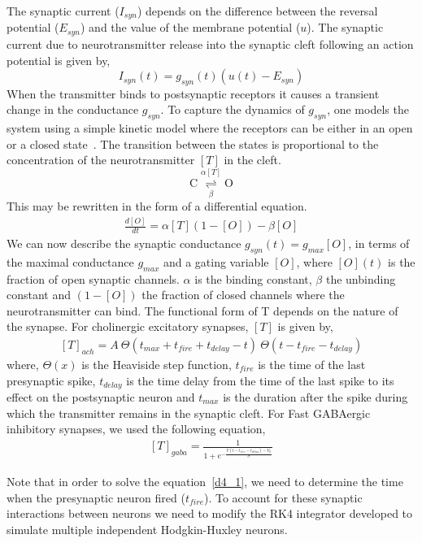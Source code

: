 \documentclass[10pt,letterpaper]{article}
\begin{document}
\begin{nolinenumbers}
The synaptic current ($I_{syn}$) depends on the difference between the reversal potential ($E_{syn}$) and the value of the membrane potential ($u$). The synaptic current due to neurotransmitter release into the synaptic cleft following an action potential is given by,
\begin{equation}
I_{syn}(t)=g_{syn}(t)(u(t)−E_{syn})
\label{eq:syncurr}
\end{equation}
When the transmitter binds to postsynaptic receptors it causes a transient change in the conductance $g_{syn}$. To capture the dynamics of $g_{syn}$, one models the system using a simple kinetic model where the receptors can be either in an open or a closed state~\cite{Destexhe1994}. The transition between the states is proportional to the concentration of the neurotransmitter $[T]$ in the cleft. 
\begin{equation}
\mathrm{C}\underset{\beta}{\stackrel{\alpha[T]}{\rightleftharpoons}} \mathrm{O}
\end{equation}
This may be rewritten in the form of a differential equation.
\begin{eqnarray}\label{d4_1}\frac{d[O]}{dt}=\alpha[T](1−[O])−\beta[O]\end{eqnarray}
We can now describe the synaptic conductance $g_{syn}(t)=g_{max}[O]$, in terms of the maximal conductance $g_{max}$ and a gating variable $[O]$, where $[O](t)$ is the fraction of open synaptic channels. $\alpha$ is the binding constant, $\beta$ the unbinding constant and $(1−[O])$ the fraction of closed channels where the neurotransmitter can bind. The functional form of T depends on the nature of the synapse.
For cholinergic excitatory synapses, $[T]$ is given by,
\begin{eqnarray}
\label{d4_2}
[T]_{ach} = A\ \Theta(t_{max}+t_{fire}+t_{delay}-t)\ \Theta(t-t_{fire}-t_{delay})
\end{eqnarray}
where, $\Theta (x)$ is the Heaviside step function, $t_{fire}$ is the time of the last presynaptic spike, $t_{delay}$ is the time delay from the time of the last spike to its effect on the postsynaptic neuron and $t_{max}$ is the duration after the spike during which the transmitter remains in the synaptic cleft.
For Fast GABAergic inhibitory synapses, we used the following equation,
\begin{eqnarray}\label{d4_3}[T]_{gaba} = \frac{1}{1+e^{-\frac{V(t-t_{fire}-t_{delay})-V_0}{\sigma}}}\end{eqnarray}

Note that in order to solve the equation~\ref{d4_1}, we need to determine the time when the presynaptic neuron fired ($t_{fire}$). To account for these synaptic interactions between neurons we need to modify the RK4 integrator developed to simulate multiple independent Hodgkin-Huxley neurons. 


\end{nolinenumbers}
\end{document}
